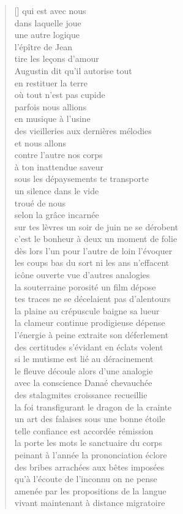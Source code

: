 \documentclass[a4paper, titlepage, twoside, 12pt]{book}
\begin{document}
\begin{verse}[\versewidth]
qui est avec nous\\
dans laquelle joue\\
une autre logique\\
l'épître de Jean\\
tire les leçons d'amour\\
Augustin dit qu'il autorise tout\\
en restituer la terre\\
où tout n'est pas cupide\\
parfois nous allions\\
en musique à l'usine\\
des vieilleries aux dernières mélodies\\
et nous allons\\
contre l'autre nos corps\\
à ton inattendue saveur\\
sous les dépaysements te transporte\\
un silence dans le vide\\
troué de nous\\
selon la grâce incarnée\\
sur tes lèvres un soir de juin ne se dérobent\\
c'est le bonheur à deux un moment de folie\\
dès lors l'un pour l'autre de loin l'évoquer\\
les coups bas du sort ni les ans n'effacent\\
icône ouverte vue d'autres analogies\\
la souterraine porosité un film dépose\\
tes traces ne se décelaient pas d'alentours\\
la plaine au crépuscule baigne sa lueur\\
la clameur continue prodigieuse dépense\\
l'énergie à peine extraite son déferlement\\
des certitudes s'évidant en éclats volent\\
si le mutisme est lié au déracinement\\
le fleuve découle alors d'une analogie \\
avec la conscience Danaé chevauchée \\
des stalagmites croissance recueillie\\
la foi transfigurant le dragon de la crainte\\
un art des falaises sous une bonne étoile\\
telle confiance est accordée rémission\\
la porte les mots le sanctuaire du corps\\
peinant à l'année la prononciation éclore\\
des bribes arrachées aux bêtes imposées\\
qu'à l'écoute de l'inconnu on ne pense\\
amenée par les propositions de la langue\\
vivant maintenant à distance migratoire

\end{verse}
\end{document}
